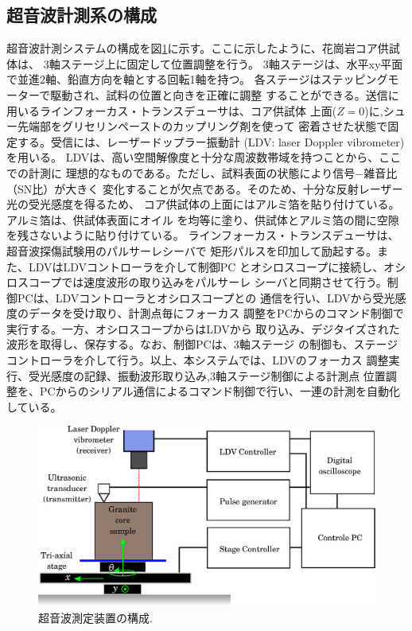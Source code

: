 \subsection{超音波計測系の構成}
超音波計測システムの構成を図\ref{fig:fig3}に示す。ここに示したように、花崗岩コア供試体は、
3軸ステージ上に固定して位置調整を行う。
3軸ステージは、水平xy平面で並進2軸、鉛直方向を軸とする回転1軸を持つ。
各ステージはステッピングモーターで駆動され、試料の位置と向きを正確に調整
することができる。送信に用いるラインフォーカス・トランスデューサは、コア供試体
上面($Z=0$)に,シュー先端部をグリセリンペーストのカップリング剤を使って
密着させた状態で固定する。受信には、レーザードップラー振動計
(LDV: laser Doppler vibrometer)を用いる。
LDVは、高い空間解像度と十分な周波数帯域を持つことから、ここでの計測に
理想的なものである。ただし、試料表面の状態により信号−雑音比（SN比）が大きく
変化することが欠点である。そのため、十分な反射レーザー光の受光感度を得るため、
コア供試体の上面にはアルミ箔を貼り付けている。アルミ箔は、供試体表面にオイル
を均等に塗り、供試体とアルミ箔の間に空隙を残さないように貼り付けている。
ラインフォーカス・トランスデューサは、超音波探傷試験用のパルサーレシーバで
矩形パルスを印加して励起する。また、LDVはLDVコントローラを介して制御PC
とオシロスコープに接続し、オシロスコープでは速度波形の取り込みをパルサーレ
シーバと同期させて行う。制御PCは、LDVコントローラとオシロスコープとの
通信を行い、LDVから受光感度のデータを受け取り、計測点毎にフォーカス
調整をPCからのコマンド制御で実行する。一方、オシロスコープからはLDVから
取り込み、デジタイズされた波形を取得し、保存する。なお、制御PCは、3軸ステージ
の制御も、ステージコントローラを介して行う。以上、本システムでは、LDVのフォーカス
調整実行、受光感度の記録、振動波形取り込み,3軸ステージ制御による計測点
位置調整を、PCからのシリアル通信によるコマンド制御で行い、一連の計測を自動化
している。
\begin{figure}[h]
	\begin{center}
	\includegraphics[width=0.8\linewidth]{Figs/fig3.eps} 
	\end{center}
	\caption{
		超音波測定装置の構成.
	} 
	\label{fig:fig3}
\end{figure}

